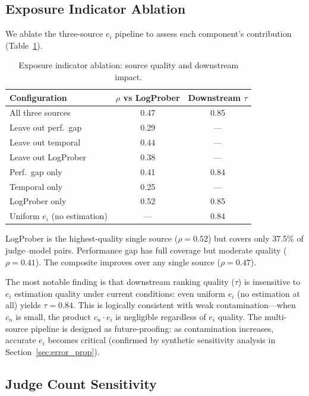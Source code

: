 \documentclass[11pt]{article}
\newcommand{\cn}{c_n}
\newcommand{\ei}{e_i}
\begin{document}
\subsection{Exposure Indicator Ablation}
\label{sec:ablation}

We ablate the three-source $\ei$ pipeline to assess each component's contribution (Table~\ref{tab:ablation}).

\begin{table}[t]
\centering
\caption{Exposure indicator ablation: source quality and downstream impact.}
\label{tab:ablation}
\small
\begin{tabular}{lcc}
\toprule
Configuration & $\rho$ vs LogProber & Downstream $\tau$ \\
\midrule
All three sources & 0.47 & 0.85 \\
Leave out perf.\ gap & 0.29 & --- \\
Leave out temporal & 0.44 & --- \\
Leave out LogProber & 0.38 & --- \\
\midrule
Perf.\ gap only & 0.41 & 0.84 \\
Temporal only & 0.25 & --- \\
LogProber only & 0.52 & 0.85 \\
\midrule
Uniform $\ei$ (no estimation) & --- & 0.84 \\
\bottomrule
\end{tabular}
\end{table}

LogProber is the highest-quality single source ($\rho = 0.52$) but covers only 37.5\% of judge--model pairs. Performance gap has full coverage but moderate quality ($\rho = 0.41$). The composite improves over any single source ($\rho = 0.47$).

The most notable finding is that downstream ranking quality ($\tau$) is insensitive to $\ei$ estimation quality under current conditions: even uniform $\ei$ (no estimation at all) yields $\tau = 0.84$. This is logically consistent with weak contamination---when $\cn$ is small, the product $\cn \cdot \ei$ is negligible regardless of $\ei$ quality. The multi-source pipeline is designed as future-proofing: as contamination increases, accurate $\ei$ becomes critical (confirmed by synthetic sensitivity analysis in Section~\ref{sec:error_prop}).

\subsection{Judge Count Sensitivity}
\label{sec:judge_sensitivity}
\end{document}

